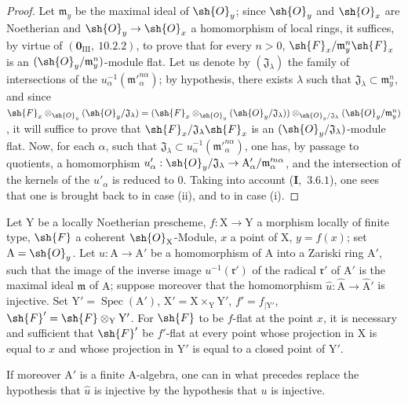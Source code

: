 \begin{proof}
Let $\mathfrak{m}_y$ be the maximal ideal of $\sh{O}_y$; since $\sh{O}_y$ and $\sh{O}_x$ are Noetherian and $\sh{O}_y\to\sh{O}_x$ a
homomorphism of local rings, it suffices, by virtue of $(\mathbf{0}_{\mathrm{III}},~10.2.2)$, to prove that for
every $n>0$, $\sh{F}_x/\mathfrak{m}_y^n\sh{F}_x$ is an $(\sh{O}_y/\mathfrak{m}_y^n)$-module flat. Let us denote by $(\mathfrak{J}_\lambda)$ the family of
intersections of the $u_\alpha^{-1}(\mathfrak{m}'^{n\alpha}_\alpha)$; by hypothesis, there exists $\lambda$ such that $\mathfrak{J}_\lambda\subset\mathfrak{m}_y^n$, and since
$\sh{F}_x\otimes_{\sh{O}_y}(\sh{O}_y/\mathfrak{J}_\lambda)=(\sh{F}_x\otimes_{\sh{O}_y}(\sh{O}_y/\mathfrak{J}_\lambda))\otimes_{\sh{O}_y/\mathfrak{J}_\lambda}(\sh{O}_y/\mathfrak{m}_y^n)$, it will suffice to prove that $\sh{F}_x/\mathfrak{J}_\lambda\sh{F}_x$ is
an $(\sh{O}_y/\mathfrak{J}_\lambda)$-module flat. Now, for each $\alpha$, such that $\mathfrak{J}_\lambda\subset u_\alpha^{-1}(\mathfrak{m}'^{n\alpha}_\alpha)$, one has, by passage
to quotients, a homomorphism $u'_\alpha:\sh{O}_y/\mathfrak{J}_\lambda\to\mathrm{A}'_\alpha/\mathfrak{m}'^{n\alpha}_\alpha$, and the intersection of the kernels
of the $u'_\alpha$ is reduced to $0$. Taking into account (\textbf{I},~$3.6.1$), one sees that one is brought back to 
in case (ii), and to  in case (i).
\end{proof}

\begin{corollary}[11.5.2]
\label{IV.11.5.2}
Let $\mathrm{Y}$ be a locally Noetherian prescheme, $f:\mathrm{X}\to\mathrm{Y}$ a
morphism locally of finite type, $\sh{F}$ a coherent $\sh{O}_\mathrm{X}$-Module, $x$ a point of $\mathrm{X}$, $y=f(x)$; set
$\mathrm{A}=\sh{O}_y$. Let $u:\mathrm{A}\to\mathrm{A}'$ be a homomorphism of $\mathrm{A}$ into a Zariski ring $\mathrm{A}'$, such that the image
of the inverse image $u^{-1}(\mathfrak{r}')$ of the radical $\mathfrak{r}'$ of $\mathrm{A}'$ is the maximal ideal $\mathfrak{m}$ of $\mathrm{A}$; suppose moreover
that the homomorphism $\hat{u}:\hat{\mathrm{A}}\to\hat{\mathrm{A}}'$ is injective. Set $\mathrm{Y}'=\operatorname{Spec}(\mathrm{A}')$, $\mathrm{X}'=\mathrm{X}\times_\mathrm{Y}\mathrm{Y}'$, $f'=f_{|\mathrm{Y}'}$,
$\sh{F}'=\sh{F}\otimes_\mathrm{Y}\mathrm{Y}'$. For $\sh{F}$ to be $f$-flat at the point $x$, it is necessary and sufficient that $\sh{F}'$ be $f'$-flat at every
point whose projection in $\mathrm{X}$ is equal to $x$ and whose projection in $\mathrm{Y}'$ is equal to a closed point
of $\mathrm{Y}'$.

If moreover $\mathrm{A}'$ is a finite $\mathrm{A}$-algebra, one can in what precedes replace the hypothesis that $\hat{u}$
is injective by the hypothesis that $u$ is injective.
\end{corollary}

